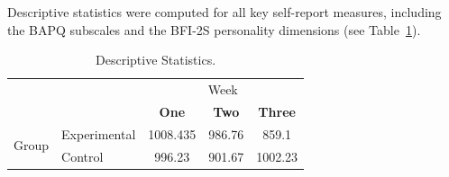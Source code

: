 Descriptive statistics were computed for all key self-report measures, including the BAPQ subscales and the BFI-2S personality dimensions (see Table~\ref{tab:table1}).

\begin{table}[H]
\caption{Descriptive Statistics.}
\label{tab:table1}
 \begin{tabular}{l l c c c}
 \toprule
                          &              & \multicolumn{3}{c}{Week}\\
  \cmidrule{3-5}
                          &              & \textbf{One}    & \textbf{Two}    & \textbf{Three}\\
  \multirow{ 2}{*}{Group} & Experimental &     1008.435    &      986.76     &      859.1     \\
                          & Control      &     996.23      &      901.67     &      1002.23   \\
  \bottomrule
 \end{tabular}
\end{table}
